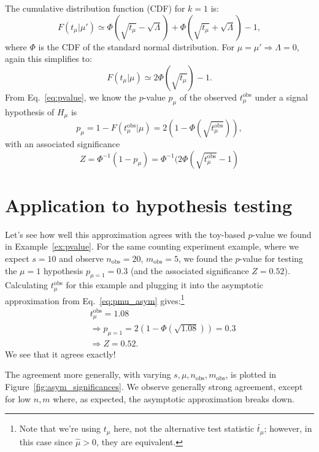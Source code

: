 The cumulative distribution function (CDF) for $k=1$ is:
\begin{equation}
    F(t_\mu|\mu') \simeq \Phi(\sqrt{t_\mu} - \sqrt\Lambda) + \Phi(\sqrt{t_\mu} + \sqrt\Lambda) - 1,
\label{eq:ptmu_cdf}
\end{equation}
where $\Phi$ is the CDF of the standard normal distribution.
For $\mu = \mu' \Rightarrow \Lambda = 0$, again this simplifies to:
\begin{equation}
    F(t_\mu|\mu) \simeq 2\Phi(\sqrt{t_\mu}) - 1.
\label{eq:ptmu_cdf_special}
\end{equation}
From Eq.~\ref{eq:pvalue}, we know the $p$-value $p_\mu$ of the observed $t_\mu^{\mathrm{obs}}$ under a signal hypothesis of $H_\mu$ is
\begin{equation}
    p_\mu = 1 - F(t_\mu^{\mathrm{obs}}|\mu) = 2(1 - \Phi(\sqrt{t_\mu^{\mathrm{obs}}})),
\label{eq:pmu_asym}
\end{equation}
with an associated significance
\begin{equation}
    Z = \Phi^{-1}(1-p_\mu) = \Phi^{-1}(2\Phi(\sqrt{t_\mu^{\mathrm{obs}}} - 1)
\label{eq:Z_asym}
\end{equation}


\section{Application to hypothesis testing}

Let's see how well this approximation agrees with the toy-based $p$-value we found in Example~\ref{ex:pvalue}.
For the same counting experiment example, where we expect $s = 10$ and observe $n_{\mathrm{obs}} = 20$, $m_{\mathrm{obs}} = 5$, we found the $p$-value for testing the $\mu = 1$ hypothesis $p_{\mu = 1} = 0.3$ (and the associated significance $Z = 0.52$).
Calculating $t_\mu^{\mathrm{obs}}$ for this example and plugging it into the asymptotic approximation from Eq.~\ref{eq:pmu_asym} gives:\footnote{Note that we're using $t_\mu$ here, not the alternative test statistic $\tilde{t_\mu}$; however, in this case since $\hat\mu > 0$, they are equivalent.}
\begin{align}
\label{eq:pmu_asym_example}
  &t_\mu^{\mathrm{obs}} = 1.08  \\
  &\Rightarrow p_{\mu = 1} = 2(1 - \Phi(\sqrt{1.08})) = 0.3 \\
  &\Rightarrow Z = 0.52.
\end{align}
We see that it agrees exactly!

The agreement more generally, with varying $s, \mu, n_{\mathrm{obs}}, m_{\mathrm{obs}}$, is plotted in Figure~\ref{fig:asym_significances}.
We observe generally strong agreement, except for low $n, m$ where, as expected, the asymptotic approximation breaks down.

